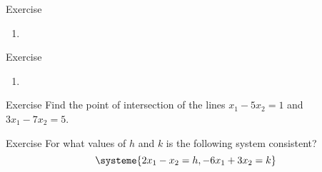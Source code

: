\documentclass{beamer}
\theoremstyle{definition}
\theoremstyle{remark}
\newcounter{saveenumi}
\newcommand{\seti}{\setcounter{saveenumi}{\value{enumi}}}
\newcommand{\conti}{\setcounter{enumi}{\value{saveenumi}}}
\begin{document}
\begin{frame}[t]{Exercise}
\begin{enumerate}
\conti
\item {}
\seti
\end{enumerate}
\end{frame}

\begin{frame}[t]{Exercise}
\begin{enumerate}
\conti
\item {}
\end{enumerate}
\end{frame}

\begin{frame}[t]{Exercise}
Find the point of intersection of the lines $x_1-5x_2=1$ and $3x_1-7x_2=5$.
\end{frame}

\begin{frame}[t]{Exercise}
For what values of $h$ and $k$ is the following system consistent?
\[
\systeme{2x_1-x_2=h, -6x_1+3x_2=k}
\]
\end{frame}
\end{document}
